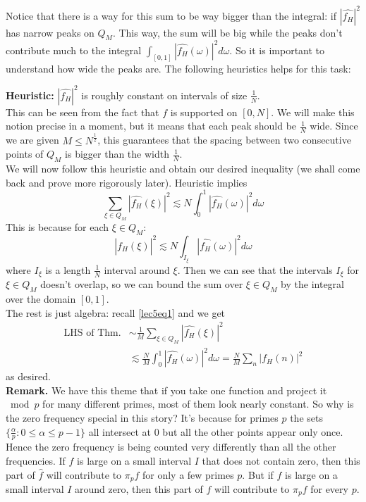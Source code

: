 \documentclass[12pt]{amsart}
\begin{document}
Notice that there is a way for this sum to be way bigger than the integral: if $|\widehat{f_H}|^2$ has narrow peaks on $Q_M$. This way, the sum will be big while the peaks don't contribute much to the integral $\int_{[0, 1]} |\widehat{f_H} (\omega)|^2 d \omega $. So it is important to understand how wide the peaks are. The following heuristics helps for this task:

\textbf{Heuristic:} $|\widehat{f_H}|^2$ is roughly constant on intervals of size $\frac{1}{N}$. \\

This can be seen from the fact that $f$ is supported on $[0, N]$. We will make this notion precise in a moment, but it means that each peak should be $\frac{1}{N}$ wide. Since we are given $M \leq N^{\frac{1}{2}}$, this guarantees that the spacing between two consecutive points of $Q_M$ is bigger than the width $\frac{1}{N}$. \\

We will now follow this heuristic and obtain our desired inequality (we shall come back and prove more rigorously later). Heuristic implies 
\begin{equation*}
    \sum_{\xi \in Q_M} |\widehat{f_H} (\xi)|^2 \lesssim N \int_{0}^{1} |\widehat{f_H} (\omega)|^2 d \omega 
\end{equation*}
This is because for each $\xi \in Q_M$:
\begin{equation*}
    |\widehat{f_H} (\xi)|^2 \lesssim N \int_{I_{\xi}} |\widehat{f_H} (\omega)|^2 d \omega
\end{equation*}
where $I_{\xi}$ is a length $\frac{1}{N}$ interval around $\xi$. Then we can see that the intervals $I_\xi$ for $\xi \in Q_M$ doesn't overlap, so we can bound the sum over $\xi \in Q_M$ by the integral over the domain $[0, 1]$. \\

The rest is just algebra: recall \eqref{lec5eq1} and we get
\begin{align}
    \text{LHS of Thm.} 
    &\sim \frac{1}{M} \sum_{\xi \in Q_M} |\widehat{f_H} (\xi)|^2 \nonumber \\
    &\lesssim \frac{N}{M} \int_{0}^{1} |\widehat{f_H} (\omega)|^2 d \omega \nonumber= \frac{N}{M} \sum_{n} |f_H(n)|^2
\end{align}
as desired. \\

\textbf{Remark.} We have this theme that if you take one function and project it $\bmod p$ for many different primes, most of them look nearly constant. So why is the zero frequency special in this story? It's because for primes $p$ the sets $\{ \frac{\alpha}{p} : 0 \leq \alpha \leq p - 1 \}$ all intersect at $0$ but all the other points appear only once. Hence the zero frequency is being counted very differently than all the other frequencies.   If $\hat f$ is large on a small interval $I$ that does not contain zero,  then this part of $\hat f$ will contribute to $\pi_p f$ for only a few primes $p$.  But if $\hat f$ is large on a small interval $I$ around zero,  then this part of $\hat f$ will contribute to $\pi_p f$ for every $p$. \\
\end{document}
